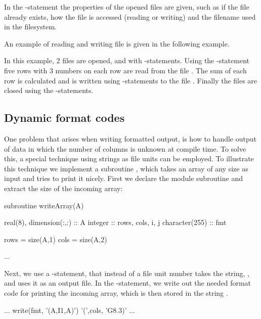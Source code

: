 In the -statement the properties of the opened files are given, such as if the file already exists, how the file is accessed (reading or writing) and the filename used in the filesystem.

An example of reading and writing file is given in the following example.


In this example, 2 files are opened,  and  with -statements. Using the -statement five rows with 3 numbers on each row are read from the file . The sum of each row is calculated and is written using -statements to the file . Finally the files are closed using the -statements.

\subsection{Dynamic format codes}

One problem that arises when writing formatted output, is how to handle output of data in which the number of columns is unknown at compile time. To solve this, a special technique using strings as file units can be employed. To illustrate this technique we implement a subroutine , which takes an array of any size as input and tries to print it nicely. First we declare the module subroutine and extract the size of the incoming array:

\begin{fortrancodeenv}
subroutine writeArray(A)
		
	real(8), dimension(:,:) :: A
	integer :: rows, cols, i, j
	character(255) :: fmt
		
	rows = size(A,1)
	cols = size(A,2)

	...
\end{fortrancodeenv}

Next, we use a -statement, that instead of a file unit number takes the string, , and uses it as an output file. In the -statement, we write out the needed format code for printing the incoming array, which is then stored in the string .

\begin{fortrancodeenv}
	...
	write(fmt, '(A,I1,A)') '(',cols, 'G8.3)'  
	...
\end{fortrancodeenv}

